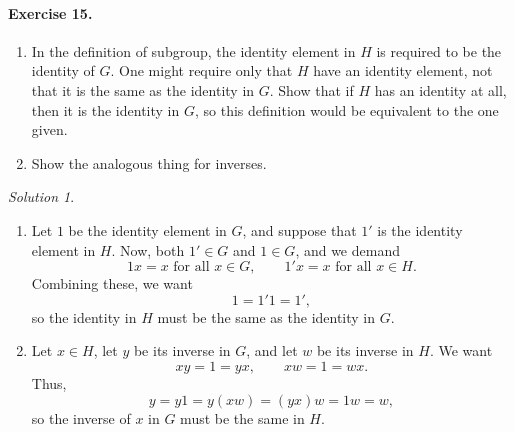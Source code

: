 \documentclass[11pt]{report}
\theoremstyle{remark}
\newtheorem*{solution}{Solution}
\begin{document}
    \paragraph{Exercise 15.} \mbox{}
    \begin{enumerate}
        \itemsep0em
        \item In the definition of subgroup, the identity element in $H$ is required
        to be the identity of $G$. One might require only that $H$ have an identity
        element, not that it is the same as the identity in $G$. Show that if $H$
        has an identity at all, then it is the identity in $G$, so this definition
        would be equivalent to the one given.
        \item Show the analogous thing for inverses.
    \end{enumerate}
    \begin{solution} \mbox{}
    \begin{enumerate}
        \item Let $1$ be the identity element in $G$, and suppose that $1'$ is the
        identity element in $H$. Now, both $1' \in G$ and $1 \in G$, and we demand \[
            1x = x\text{ for all } x\in G, \qquad 1'x = x \text{ for all } x\in H.
        \] Combining these, we want \[
            1 = 1'1 = 1',
        \] so the identity in $H$ must be the same as the identity in $G$.
        
        \item Let $x \in H$, let $y$ be its inverse in $G$, and let $w$ be its
        inverse in $H$. We want \[
            xy = 1 = yx, \qquad xw = 1 = wx.
        \] Thus, \[
            y = y1 = y(xw) = (yx)w = 1w = w,
        \] so the inverse of $x$ in $G$ must be the same in $H$.
    \end{enumerate}
    \end{solution}
\end{document}
